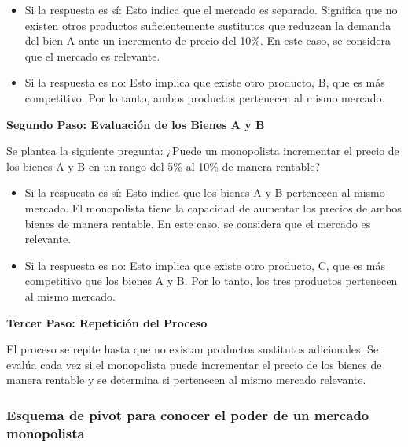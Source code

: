\documentclass[
  letterpaper,
  DIV=11,
  numbers=noendperiod]{scrartcl}
\begin{document}
\begin{itemize}
\item
  Si la respuesta es sí: Esto indica que el mercado es separado.
  Significa que no existen otros productos suficientemente sustitutos
  que reduzcan la demanda del bien A ante un incremento de precio del
  10\%. En este caso, se considera que el mercado es relevante.
\item
  Si la respuesta es no: Esto implica que existe otro producto, B, que
  es más competitivo. Por lo tanto, ambos productos pertenecen al mismo
  mercado.
\end{itemize}

\textbf{Segundo Paso: Evaluación de los Bienes A y B}

Se plantea la siguiente pregunta: ¿Puede un monopolista incrementar el
precio de los bienes A y B en un rango del 5\% al 10\% de manera
rentable?

\begin{itemize}
\item
  Si la respuesta es sí: Esto indica que los bienes A y B pertenecen al
  mismo mercado. El monopolista tiene la capacidad de aumentar los
  precios de ambos bienes de manera rentable. En este caso, se considera
  que el mercado es relevante.
\item
  Si la respuesta es no: Esto implica que existe otro producto, C, que
  es más competitivo que los bienes A y B. Por lo tanto, los tres
  productos pertenecen al mismo mercado.
\end{itemize}

\textbf{Tercer Paso: Repetición del Proceso}

El proceso se repite hasta que no existan productos sustitutos
adicionales. Se evalúa cada vez si el monopolista puede incrementar el
precio de los bienes de manera rentable y se determina si pertenecen al
mismo mercado relevante.

\hypertarget{esquema-de-pivot-para-conocer-el-poder-de-un-mercado-monopolista}{%
\subsubsection{Esquema de pivot para conocer el poder de un mercado
monopolista}\label{esquema-de-pivot-para-conocer-el-poder-de-un-mercado-monopolista}}
\end{document}
